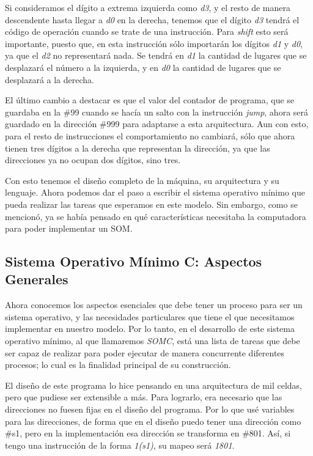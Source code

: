 \documentclass[letterpaper,12pt,oneside]{book}
\begin{document}
		
		Si consideramos el dígito a extrema izquierda como \textit{d3}, y el resto de manera descendente
		hasta llegar a \textit{d0} en la derecha, tenemos que el dígito \textit{d3} tendrá el código de operación cuando se trate de una instrucción. 
		Para \textit{shift} esto será importante, puesto que, en esta instrucción sólo importarán los dígitos \textit{d1} y \textit{d0}, ya que el 	
		\textit{d2} no representará nada. Se tendrá en \textit{d1} la cantidad de lugares que se desplazará el número a la izquierda, y 
		en \textit{d0} la cantidad de lugares que se desplazará a la derecha.
		
		El último cambio a destacar es que el valor del contador de programa, que se guardaba en la \#99 cuando se hacía un salto con la instrucción 
		\textit{jump}, ahora
		será guardado en la dirección \#999 para adaptarse a esta arquitectura. Aun con esto, para el resto de instrucciones
		el comportamiento no cambiará, sólo que ahora tienen tres dígitos a la derecha que representan la dirección, ya que las
		direcciones
		ya no ocupan dos dígitos, sino tres.
		
		Con esto tenemos el diseño completo de la máquina, su arquitectura y su lenguaje. Ahora podemos dar el paso a escribir el sistema operativo 
		mínimo que
		pueda realizar las tareas que esperamos en este modelo. Sin embargo, como se mencionó, ya se había pensado en qué características necesitaba la 
		computadora
		para poder implementar un SOM.

		
		\subsection{Sistema Operativo Mínimo C: Aspectos Generales}
		
		Ahora conocemos los aspectos esenciales que debe tener un proceso para ser un sistema operativo, y las necesidades particulares que tiene
		el que necesitamos implementar en nuestro modelo. Por lo tanto, en el desarrollo de este sistema operativo
		mínimo, al que llamaremos \textit{SOMC}, está una lista de tareas que debe ser capaz de realizar para poder ejecutar de manera
		concurrente diferentes procesos; lo cual es la finalidad principal de su construcción.
		
		El diseño de este programa lo hice pensando en una arquitectura de mil celdas, pero que pudiese ser extensible a más. Para lograrlo, era 
		necesario
		que las direcciones no fuesen fijas en el diseño del programa. Por lo que usé variables para las direcciones, de forma que en
		el diseño puedo tener una dirección como \#s1, pero en la implementación esa dirección se transforma en \#801. Así, si tengo una
		instrucción de la forma \textit{1(s1)}, su mapeo será \textit{1801}.
  
\end{document}
